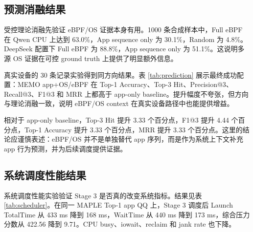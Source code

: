 \subsection{预测消融结果}

受控理论消融先验证 eBPF/OS 证据本身有用。1000 条合成样本中，Full eBPF 在 Qwen CPU 上达到 63.0\%，App sequence only 为 30.1\%，Random 为 4.8\%。DeepSeek 配置下 Full eBPF 为 88.8\%，App sequence only 为 51.1\%。这说明多源 OS 证据在可控 ground truth 上提供了明显额外信息。

真实设备的 30 条记录实验得到同方向结果。表 \ref{tab:prediction} 展示最终成功配置：MEMO app+OS/eBPF 在 Top-1 Accuracy、Top-3 Hit、Precision@3、Recall@3、F1@3 和 MRR 上都高于 app-only baseline。提升幅度不夸张，但方向与理论消融一致，说明 eBPF/OS context 在真实设备路径中也能提供增益。

\begin{table}[htbp]
\centering
\caption{30 条真实记录预测实验结果}
\label{tab:prediction}
\end{table}

相对于 app-only baseline，Top-3 Hit 提升 3.33 个百分点，F1@3 提升 4.44 个百分点，Top-1 Accuracy 提升 3.33 个百分点，MRR 提升 3.33 个百分点。这里的结论应谨慎表述：eBPF/OS 并不是单独替代 app 序列，而是作为系统上下文补充 app 行为预测，并为后续调度提供证据。

\subsection{系统调度性能结果}

系统调度性能实验验证 Stage 3 是否真的改变系统指标。结果见表 \ref{tab:scheduler}。在同一 MAPLE Top-1 app QQ 上，Stage 3 调度后 Launch TotalTime 从 433 ms 降到 168 ms，WaitTime 从 440 ms 降到 173 ms，综合压力分数从 422.56 降到 9.71。CPU busy、iowait、reclaim 和 jank rate 也下降。

